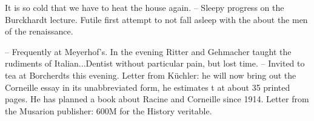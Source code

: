 
It is so cold that we have to heat the house again. -- Sleepy progress on the Burckhardt lecture. Futile first attempt to not fall asleep with the  about the men of the renaissance. 

-- Frequently at Meyerhof's. In the evening Ritter and Gehmacher taught the rudiments of Italian...Dentist without particular pain, but lost time. -- Invited to tea at Borcherdts this evening. Letter from Küchler: he will now bring out the Corneille essay in its unabbreviated form, he estimates 
t at about 35 printed pages. He has planned a book about Racine and Corneille since 1914. Letter from the Musarion publisher: 600M for the History veritable. 
